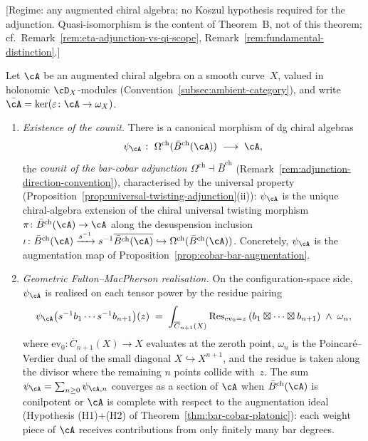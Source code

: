\begin{theorem}
\label{thm:geom-unit}%
\label{thm:bar-cobar-adjunction}%
%
%
\textup{[Regime: any augmented chiral algebra; no Koszul hypothesis required for the
adjunction. Quasi-isomorphism is the content of
Theorem~B, not of this
theorem; cf.\ Remark~\ref{rem:eta-adjunction-vs-qi-scope},
Remark~\ref{rem:fundamental-distinction}.]}

Let $\cA$ be an augmented chiral algebra on a smooth curve~$X$, valued in
holonomic $\cD_X$-modules
\textup{(}Convention~\ref{subsec:ambient-category}\textup{)}, and write
$\bar{\cA} = \ker(\varepsilon\colon \cA \to \omega_X)$.

\begin{enumerate}[label=\textup{(\arabic*)}]
\item \emph{Existence of the counit.} There is a canonical morphism of dg
chiral algebras
\[
\psi_{\cA} \;\colon\; \Omega^{\mathrm{ch}}(\bar{B}^{\mathrm{ch}}(\cA))
 \;\longrightarrow\; \cA,
\]
the \emph{counit of the bar-cobar adjunction
$\Omega^{\mathrm{ch}} \dashv \bar{B}^{\mathrm{ch}}$}
\textup{(}Remark~\ref{rem:adjunction-direction-convention}\textup{)},
characterised by the universal property
\textup{(}Proposition~\ref{prop:universal-twisting-adjunction}(ii)\textup{)}:
$\psi_{\cA}$ is the unique chiral-algebra extension of the chiral universal
twisting morphism
$\pi \colon \bar{B}^{\mathrm{ch}}(\cA) \to \cA$ along the desuspension
inclusion
$\iota \colon \bar{B}^{\mathrm{ch}}(\cA) \xrightarrow{s^{-1}}
s^{-1}\overline{\bar{B}^{\mathrm{ch}}(\cA)}
\hookrightarrow \Omega^{\mathrm{ch}}(\bar{B}^{\mathrm{ch}}(\cA))$.
Concretely, $\psi_{\cA}$ is the augmentation map of
Proposition~\ref{prop:cobar-bar-augmentation}.

\item \emph{Geometric Fulton--MacPherson realisation.} On the
configuration-space side, $\psi_{\cA}$ is realised on each tensor power by
the residue pairing
\begin{equation}\label{eq:psi-FM-realisation}
\psi_{\cA}\bigl(s^{-1}b_1 \cdots s^{-1}b_{n+1}\bigr)(z)
\;=\;
\int_{\overline{C}_{n+1}(X)}
 \mathrm{Res}_{\mathrm{ev}_0 = z}\,(b_1 \boxtimes \cdots \boxtimes b_{n+1})
 \;\wedge\; \omega_n,
\end{equation}
where $\mathrm{ev}_0 \colon \overline{C}_{n+1}(X) \to X$ evaluates at the
zeroth point, $\omega_n$ is the Poincar\'e--Verdier dual of the small
diagonal $X \hookrightarrow X^{n+1}$, and the residue is taken along the
divisor where the remaining $n$ points collide with~$z$. The sum
$\psi_{\cA} = \sum_{n\geq 0} \psi_{\cA,n}$ converges as a section of
$\cA$ when $\bar{B}^{\mathrm{ch}}(\cA)$ is conilpotent or $\cA$ is complete
with respect to the augmentation ideal
\textup{(}Hypothesis (H1)+(H2) of
Theorem~\ref{thm:bar-cobar-platonic}\textup{)}: each weight piece of $\cA$
receives contributions from only finitely many bar degrees.


\end{enumerate}
\end{theorem}
